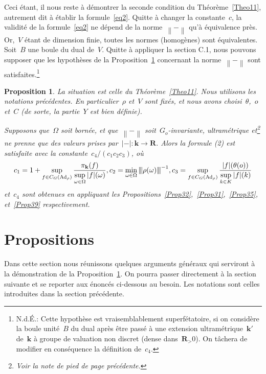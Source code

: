 \documentclass[french]{amsart}
\newcommand{\kk}{\mathbf{k}}
\newcommand{\abs}[1]{{\left|{#1}\right|}}
\newcommand{\Ad}{\mathrm{Ad}}
\newcommand{\Nm}[1]{{\left\|{#1}\right\|}}
\newcommand{\R}{\mathbf{R}}
\newtheorem{proposition}{Proposition}[section]
\newcommand{\NM}[1]{{\left\vert\kern-0.25ex\left\vert\kern-0.25ex\left\vert #1 
    \right\vert\kern-0.25ex\right\vert\kern-0.25ex\right\vert}}
\begin{document}
Ceci étant, il nous reste à démontrer la seconde condition du Théorème~\ref{Theo11}, autrement dit à établir la formule~\eqref{eq2}. Quitte à changer la constante~$c$, la validité
de la formule~\eqref{eq2} ne dépend de la norme~$\Nm{-}$ qu'à équivalence près. Or,~$V$ étant de
dimension finie, toutes les normes (homogènes) sont équivalentes. 
Soit~$B$ une
boule du dual de~$V$. Quitte à appliquer la section C.1, nous pouvons supposer que les hypothèses de la Proposition~\ref{Prop22} concernant la norme~$\Nm{-}$ sont satisfaites.\footnote{\label{pied B}N.d.É.: Cette hypothèse est vraisemblablement superfétatoire, si on considère la boule unité~$B$ du dual après être passé à une extension ultramétrique~$\kk'$ de~$\kk$ à groupe de valuation non discret (dense dans~$\R_>0$). On tâchera de modifier en conséquence la définition de~$c_4$.} 
\begin{proposition}\label{Prop22}
La situation est celle du Théorème~\ref{Theo11}. Nous utilisons les notations
précédentes. En particulier~$\rho$ et~$V$ sont fixés, et nous avons choisi~$\theta$,~$o$ et~$C$ (de sorte, la partie~$Y$ est bien définie).

Supposons que~$\Omega$ soit bornée, et que~$\Nm{-}$ soit~$G_o$-invariante, ultramétrique et\footnote{Voir la note de pied de page précédente.} ne prenne que des valeurs prises par~$\abs{-} : \kk \rightarrow \R$. Alors la formule (2) est satisfaite avec la constante~$c_4/(c_1c_2c_3)$, où
\[
c_1=1+\sup_{f\in C_G(\Ad_\rho)}
	\frac{\pi_\kk(f)}
	{
		\displaystyle{\sup_{\omega\in\Omega}\abs{f}(\omega)}
	},
c_2=\min_{\omega\in\Omega}\NM{\rho(\omega)}^{-1},
c_3=\sup_{f\in C_G(\Ad_\rho)}
	\frac{\abs{f}(\theta(o))}
	{
		\displaystyle{\sup_{k\in K}\abs{f}(k)}
	}
\]
et~$c_4$ sont obtenues en appliquant les Propositions~\ref{Prop32},~\ref{Prop31},~\ref{Prop35}, et~\ref{Prop39} respectivement.
\end{proposition}

\section{Propositions}\label{section3}
Dans cette section nous réunissons quelques arguments généraux qui serviront à la démonstration de la Proposition~\ref{Prop22}. On pourra passer directement à la section suivante et se reporter aux énoncés ci-dessous au besoin. Les notations sont celles introduites dans la section précédente.
\end{document}
